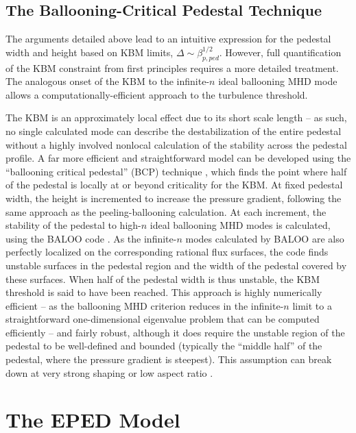 \subsection{The Ballooning-Critical Pedestal Technique}\label{subsec:mod_bcp}

The arguments detailed above lead to an intuitive expression for the pedestal width and height based on KBM limits, $\Delta \sim \beta_{p,ped}^{1/2}$.  However, full quantification of the KBM constraint from first principles requires a more detailed treatment.  The analogous onset of the KBM to the infinite-$n$ ideal ballooning MHD mode allows a computationally-efficient approach to the turbulence threshold.

The KBM is an approximately local effect due to its short scale length -- as such, no single calculated mode can describe the destabilization of the entire pedestal without a highly involved nonlocal calculation of the stability across the pedestal profile.  A far more efficient and straightforward model can be developed using the ``ballooning critical pedestal'' (BCP) technique \cite{Snyder2010,Snyder2011}, which finds the point where half of the pedestal is locally at or beyond criticality for the KBM.  At fixed pedestal width, the height is incremented to increase the pressure gradient, following the same approach as the peeling-ballooning calculation.  At each increment, the stability of the pedestal to high-$n$ ideal ballooning MHD modes is calculated, \eg using the BALOO code \cite{Connor1979,Miller1987}.  As the infinite-$n$ modes calculated by BALOO are also perfectly localized on the corresponding rational flux surfaces, the code finds unstable surfaces in the pedestal region and the width of the pedestal covered by these surfaces.  When half of the pedestal width is thus unstable, the KBM threshold is said to have been reached.  This approach is highly numerically efficient -- as the ballooning MHD criterion reduces in the infinite-$n$ limit to a straightforward one-dimensional eigenvalue problem \cite{Connor1979} that can be computed efficiently -- and fairly robust, although it does require the unstable region of the pedestal to be well-defined and bounded (typically the ``middle half'' of the pedestal, where the pressure gradient is steepest).  This assumption can break down at very strong shaping or low aspect ratio \cite{Snyder2011}.\nicesectionending

\section{The EPED Model}\label{sec:mod_eped}


